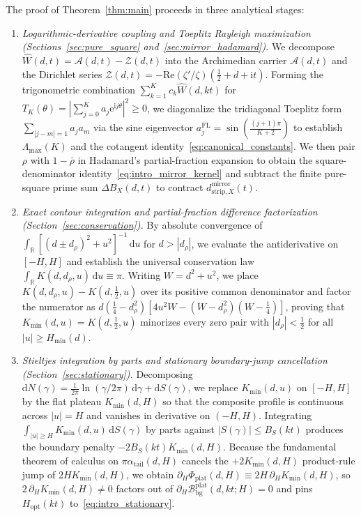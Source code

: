 \documentclass[11pt,reqno]{amsart}
\theoremstyle{definition}
\theoremstyle{remark}
\numberwithin{equation}{section}
\newcommand{\R}{\mathbb{R}}
\newcommand{\dd}{\mathrm{d}}
\newcommand{\ee}{\mathrm{e}}
\newcommand{\ii}{\mathrm{i}}
\newcommand{\Rea}{\mathrm{Re}}
\begin{document}
The proof of Theorem~\ref{thm:main} proceeds in three analytical stages:
\begin{enumerate}[label=\textup{(\arabic*)},leftmargin=2.2em]
\item \textit{Logarithmic-derivative coupling and Toeplitz Rayleigh maximization (Sections~\ref{sec:pure_square} and~\ref{sec:mirror_hadamard}).} We decompose $\widehat{W}(d,t) = \mathcal{A}(d,t) - \mathcal{Z}(d,t)$ into the Archimedian carrier $\mathcal{A}(d,t)$ and the Dirichlet series $\mathcal{Z}(d,t) = -\Rea(\zeta'/\zeta)(\frac{1}{2}+d+\ii t)$. Forming the trigonometric combination $\sum_{k=1}^K c_k \widehat{W}(d,kt)$ for $T_K(\theta) = |\sum_{j=0}^K a_j \ee^{\ii j\theta}|^2 \ge 0$, we diagonalize the tridiagonal Toeplitz form $\sum_{|j-m|=1} a_j a_m$ via the sine eigenvector $a_j^{\mathrm{FL}} = \sin(\frac{(j+1)\pi}{K+2})$ to establish $\Lambda_{\max}(K)$ and the cotangent identity~\eqref{eq:canonical_constants}. We then pair $\rho$ with $1 - \bar{\rho}$ in Hadamard's partial-fraction expansion to obtain the square-denominator identity~\eqref{eq:intro_mirror_kernel} and subtract the finite pure-square prime sum $\Delta B_X(d,t)$ to contract $d_{\mathrm{strip},X}^{\mathrm{mirror}}(t)$.
\item \textit{Exact contour integration and partial-fraction difference factorization (Section~\ref{sec:conservation}).} By absolute convergence of $\int_{\R} [(d \pm d_\rho)^2 + u^2]^{-1}\,\dd u$ for $d > |d_\rho|$, we evaluate the antiderivative on $[-H, H]$ and establish the universal conservation law $\int_{\R} K(d, d_\rho, u)\,\dd u \equiv \pi$. Writing $W = d^2 + u^2$, we place $K(d, d_\rho, u) - K(d, \frac{1}{2}, u)$ over its positive common denominator and factor the numerator as $d(\frac{1}{4} - d_\rho^2)[4u^2 W - (W - d_\rho^2)(W - \frac{1}{4})]$, proving that $K_{\min}(d,u) = K(d, \frac{1}{2}, u)$ minorizes every zero pair with $|d_\rho| < \frac{1}{2}$ for all $|u| \ge H_{\min}(d)$.
\item \textit{Stieltjes integration by parts and stationary boundary-jump cancellation (Section~\ref{sec:stationary}).} Decomposing $\dd N(\gamma) = \frac{1}{2\pi}\ln(\gamma/2\pi)\,\dd\gamma + \dd S(\gamma)$, we replace $K_{\min}(d,u)$ on $[-H, H]$ by the flat plateau $K_{\min}(d,H)$ so that the composite profile is continuous across $|u| = H$ and vanishes in derivative on $(-H, H)$. Integrating $\int_{|u| \ge H} K_{\min}(d,u)\,\dd S(\gamma)$ by parts against $|S(\gamma)| \le B_S(kt)$ produces the boundary penalty $-2B_S(kt)K_{\min}(d,H)$. Because the fundamental theorem of calculus on $\pi\alpha_{\mathrm{tail}}(d,H)$ cancels the $+2K_{\min}(d,H)$ product-rule jump of $2H K_{\min}(d,H)$, we obtain $\partial_H \Phi_{\mathrm{plat}}(d,H) \equiv 2H\,\partial_H K_{\min}(d,H)$, so $2\,\partial_H K_{\min}(d,H) \neq 0$ factors out of $\partial_H \mathcal{B}_{\mathrm{bg}}^{\mathrm{plat}}(d,kt;H) = 0$ and pins $H_{\mathrm{opt}}(kt)$ to~\eqref{eq:intro_stationary}.
\end{enumerate}
\end{document}
